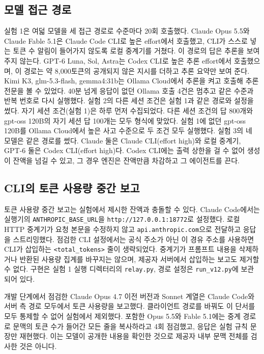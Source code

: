 \subsection{모델 접근 경로}\label{app:models}
실험 1은 여덟 모델을 세 접근 경로로 수준마다 20회 호출했다. Claude Opus 5.5와 Claude Fable 5.1은 Claude Code CLI로 높은 effort에서 호출했고, CLI가 스스로 넣는 토큰 수 알림이 들어가지 않도록 로컬 중계기를 거쳤다. 이 경로의 답은 추론을 보여 주지 않는다. GPT-6 Luna, Sol, Astra는 Codex CLI로 높은 추론 effort에서 호출했으며, 이 경로는 약 8,000토큰의 공개되지 않은 지시를 더하고 추론 요약만 보여 준다. Kimi K3, glm-5.3-flash, gemma4:31b는 Ollama Cloud에서 추론을 켜고 호출해 추론 전문을 볼 수 있었다. 40분 넘게 응답이 없던 Ollama 호출 4건은 멈추고 같은 수준과 반복 번호로 다시 실행했다. 실험 2의 다른 세션 조건은 실험 1과 같은 경로와 설정을 썼다. 자기 세션 조건(실험 1)은 하루 먼저 수집되었다. 다른 세션 조건의 답 800개와 gpt-oss 120B의 자기 세션 답 100개는 모두 형식에 맞았다. 실험 1에 없던 gpt-oss 120B를 Ollama Cloud에서 높은 사고 수준으로 두 조건 모두 실행했다. 실험 3의 네 모델은 같은 경로를 썼다. Claude 둘은 Claude CLI(effort high)와 로컬 중계기, GPT-6 둘은 Codex CLI(effort high)다. Codex CLI에는 출력 상한을 걸 수 없어 생성이 잔액을 넘길 수 있고, 그 경우 엔진은 잔액만큼 차감하고 그 에이전트를 끈다.

\subsection{CLI의 토큰 사용량 중간 보고}\label{app:cli-reminders}
토큰 사용량 중간 보고는 실험에서 제시한 잔액과 충돌할 수 있다. Claude Code에서는 실행기의 \texttt{ANTHROPIC\_BASE\_URL}을 \texttt{http://127.0.0.1:18772}로 설정했다. 로컬 HTTP 중계기가 요청 본문을 수정하지 않고 \texttt{api.anthropic.com}으로 전달하고 응답을 스트리밍했다. 점검한 CLI 설정에서는 공식 주소가 아닌 이 경유 주소를 사용하면 CLI가 삽입하는 \texttt{<total\_tokens>} 줄이 생략되었다. 중계기가 프롬프트 내용을 삭제하거나 반환된 사용량 집계를 바꾸지는 않으며, 제공자 서버에서 삽입하는 보고도 제거할 수 없다. 구현은 실험 1 실행 디렉터리의 \texttt{relay.py}, 경로 설정은 \texttt{run\_v12.py}에 보관되어 있다.

개발 단계에서 점검한 Claude Opus 4.7 이전 버전과 Sonnet 계열은 Claude Code와 서버 측 경로 모두에서 토큰 사용량을 보고했다. 클라이언트 경로를 바꿔도 이 단서를 모두 통제할 수 없어 실험에서 제외했다. 포함한 Opus 5.5와 Fable 5.1에는 중계 경로로 문맥의 토큰 수가 들어간 모든 줄을 복사하라고 4회 점검했고, 응답은 실험 규칙 문장만 재현했다. 이는 모델이 공개한 내용을 확인한 것으로 제공자 내부 문맥 전체를 검사한 것은 아니다.

